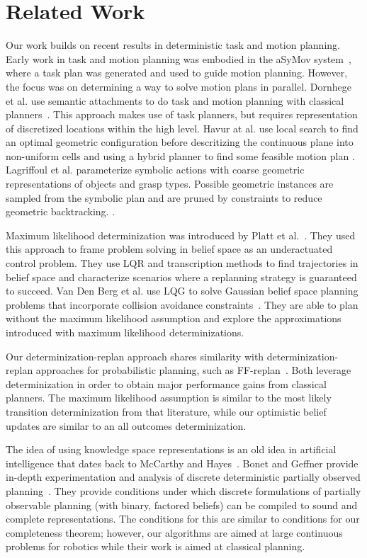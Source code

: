 \section{Related Work}
Our work builds on recent results in deterministic task and motion
planning. Early work in task and motion planning was embodied in the
aSyMov system~\cite{gravot2005asymov}, where a task plan was generated
and used to guide motion planning. However, the focus was on
determining a way to solve motion plans in parallel. Dornhege et
al. use semantic attachments to do task and motion planning with
classical planners~\cite{dornhege2012semantic}. This approach makes
use of task planners, but requires representation of discretized
locations within the high level. Havur at al. use local search to find an optimal geometric configuration before descritizing the continuous plane into non-uniform cells and using a hybrid planner to find some feasible motion plan \cite{havur2014geometric}. Lagriffoul et al. parameterize symbolic actions with coarse geometric representations of objects and grasp types. Possible geometric instances are sampled from the symbolic plan and are pruned by constraints to reduce geometric backtracking. \cite{lagriffoul2014orientation}.

Maximum likelihood determinization was introduced by Platt et
al.~\cite{platt2010belief}. They used this approach to frame problem
solving in belief space as an underactuated control problem. They use
LQR and transcription methods to find trajectories in belief space and
characterize scenarios where a replanning strategy is guaranteed to
succeed. Van Den Berg et al. use LQG to solve Gaussian belief space
planning problems that incorporate collision avoidance
constraints~\cite{van2012motion}. They are able to plan without
the maximum likelihood assumption and explore the approximations
introduced with maximum likelihood determinizations.

Our determinization-replan approach shares similarity with
determinization-replan approaches for probabilistic planning, such as
FF-replan~\cite{yoon2007ff}. Both leverage determinization in order to
obtain major performance gains from classical planners. The maximum
likelihood assumption is similar to the most likely transition
determinization from that literature, while our optimistic belief
updates are similar to an all outcomes determinization.

The idea of using knowledge space representations is an old idea in
artificial intelligence that dates back to McCarthy and
Hayes~\cite{mccarthy1968some}. Bonet and Geffner provide in-depth
experimentation and analysis of discrete deterministic partially
observed planning~\cite{bonet2011planning}.  They provide conditions
under which discrete formulations of partially observable planning
(with binary, factored beliefs) can be compiled to sound and complete
representations. The conditions for this are similar to conditions
for our completeness theorem; however, our algorithms are aimed at
large continuous problems for robotics while their work is aimed at
classical planning.

